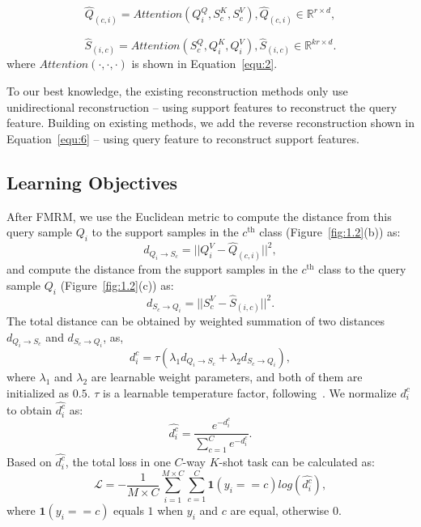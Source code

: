 \documentclass[letterpaper]{article} %
\begin{document}
\begin{equation}
\hat{Q}_{(c, i)} = Attention(Q_i^Q, S_c^K, S_c^V), \hat{Q}_{(c, i)} \in \mathbb{R}^{r\times d},
\label{equ:5}
\end{equation}

\begin{equation}
\hat{S}_{(i, c)} = Attention(S_c^Q, Q_i^K, Q_i^V), \hat{S}_{(i, c)}\in \mathbb{R}^{kr\times d}.
\label{equ:6}
\end{equation}
where $Attention(\cdot, \cdot, \cdot)$ is shown in Equation~\ref{equ:2}.

To our best knowledge, the existing reconstruction methods only use unidirectional reconstruction -- using support features to reconstruct the query feature. Building on existing methods, we add the reverse reconstruction shown in Equation~\ref{equ:6} -- using query feature to reconstruct support features.

\subsection{Learning Objectives}



After FMRM, we use the {Euclidean} metric to compute the distance from this query sample $Q_i$ to the support samples in the $c^\text{th}$ class (Figure~\ref{fig:1.2}(b)) as:
\begin{equation}
d_{Q_i \to S_c} = ||Q_i^V - \hat{Q}_{(c, i)}||^2,
\label{equ:7}
\end{equation}
and compute the distance from the support samples in the $c^\text{th}$ class to the query sample $Q_i$ (Figure~\ref{fig:1.2}(c)) as:
\begin{equation}
d_{S_c \to Q_i} = ||S_c^V - \hat{S}_{(i, c)}||^2.
\label{equ:8}
\end{equation}
The total distance can be obtained by weighted summation of two distances $d_{Q_i \to S_c}$ and $d_{S_c \to Q_i}$, as,
\begin{equation}
d_i^c = \tau(\lambda_1 d_{Q_i \to S_c} + \lambda_2 d_{S_c \to Q_i}),
\label{equ:9}
\end{equation}
where $\lambda_1$ and $\lambda_2$ are learnable weight parameters, and both of them are initialized as $0.5$. $\tau$ is a learnable temperature factor, following~\cite{Wertheimer_2021_CVPR, Ye_2020_CVPR, Chen2020ANM, Gidaris2018DynamicFV}.
We normalize $d_i^c$ to obtain $\hat{d_i^c}$ as:
\begin{equation}
\hat{d_i^c} = \frac{e^{-d_i^c}}{\sum_{c=1}^C e^{-d_i^c}}.
\end{equation}
Based on $\hat{d_i^c}$, the total loss in one $C$-way $K$-shot task can be calculated as:
\begin{equation}
\mathcal{L} = -\frac{1}{M \times C} \sum_{i=1}^{M \times C} \sum_{c=1}^C \textbf{1}(y_ i==c) log(\hat{d_i^c}),
\end{equation}
where $\textbf{1}(y_i==c)$ equals $1$ when $y_i$ and $c$ are equal, otherwise $0$.
\end{document}
